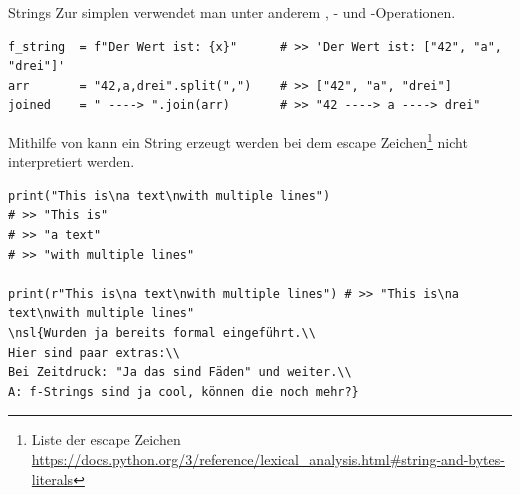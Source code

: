 \documentclass[12pt, aspectratio=169, usepdftitle=false]{beamer}
\newcommand{\nsl}[1]{\note{\large{#1}}}
\begin{document}
\begin{frame}[fragile]{Strings}
  Zur simplen  verwendet man unter anderem , - und -Operationen.
  \begin{lstlisting}[language=pytiny]
f_string  = f"Der Wert ist: {x}"      # >> 'Der Wert ist: ["42", "a", "drei"]'
arr       = "42,a,drei".split(",")    # >> ["42", "a", "drei"]
joined    = " ----> ".join(arr)       # >> "42 ----> a ----> drei"
  \end{lstlisting}

Mithilfe von  kann ein String erzeugt werden bei dem escape Zeichen\footnote {
  Liste der escape Zeichen \url{https://docs.python.org/3/reference/lexical_analysis.html\#string-and-bytes-literals}
} nicht interpretiert werden.

\begin{lstlisting}[language=pytiny]
print("This is\na text\nwith multiple lines")
# >> "This is"
# >> "a text"
# >> "with multiple lines"

print(r"This is\na text\nwith multiple lines") # >> "This is\na text\nwith multiple lines"
\nsl{Wurden ja bereits formal eingeführt.\\
Hier sind paar extras:\\
Bei Zeitdruck: "Ja das sind Fäden" und weiter.\\
A: f-Strings sind ja cool, können die noch mehr?}
\end{lstlisting}

\end{frame}
\end{document}
